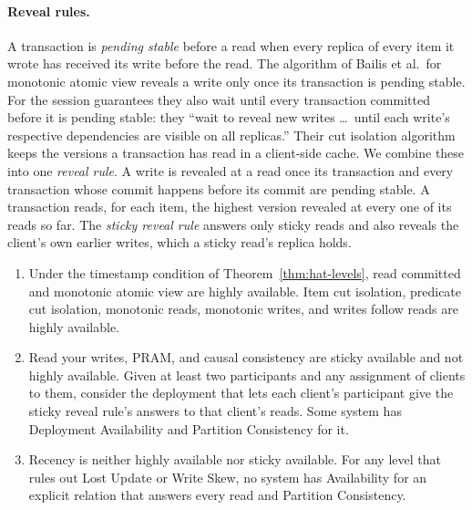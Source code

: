 \paragraph{Reveal rules.}
A transaction is \emph{pending stable} before a read when every replica of
every item it wrote has received its write before the read.  The algorithm of
Bailis et al.\ for monotonic atomic view reveals a write only once its
transaction is pending stable.  For the session guarantees they also wait
until every transaction committed before it is pending stable: they ``wait to
reveal new writes \ldots\ until each write's respective dependencies are
visible on all replicas.''  Their cut isolation algorithm keeps the versions a
transaction has read in a client-side cache.  We combine these into one
\emph{reveal rule}.  A write is revealed at a read once its transaction and
every transaction whose commit happens before its commit are pending stable.
A transaction reads, for each item, the highest version revealed at every one
of its reads so far.  The \emph{sticky reveal rule} answers only sticky reads
and also reveals the client's own earlier writes, which a sticky read's
replica holds.

\begin{theorem}
\label{thm:hat-taxonomy}
\leavevmode
\begin{enumerate}
  \item Under the timestamp condition of Theorem~\ref{thm:hat-levels}, read
        committed and monotonic atomic view are highly available.  Item cut
        isolation, predicate cut isolation, monotonic reads, monotonic
        writes, and writes follow reads are highly available.
  \item Read your writes, PRAM, and causal consistency are sticky available
        and not highly available.  Given at least two participants and any
        assignment of clients to them, consider the deployment that lets each
        client's participant give the sticky reveal rule's answers to that
        client's reads.  Some system has Deployment Availability and Partition
        Consistency for it.
  \item Recency is neither highly available nor sticky available.  For any
        level that rules out Lost Update or Write Skew, no system has
        Availability for an explicit relation that answers every read and
        Partition Consistency.
\end{enumerate}
\end{theorem}

